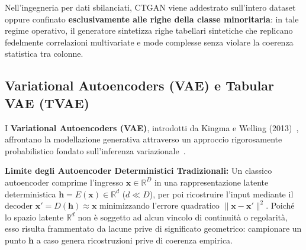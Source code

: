 Nell'ingegneria per dati sbilanciati, CTGAN viene addestrato sull'intero dataset oppure confinato \textbf{esclusivamente alle righe della classe minoritaria}: in tale regime operativo, il generatore sintetizza righe tabellari sintetiche che replicano fedelmente correlazioni multivariate e mode complesse senza violare la coerenza statistica tra colonne.

\FloatBarrier
\subsection{Variational Autoencoders (VAE) e Tabular VAE (TVAE)}
\label{subsec:dm-vae-tvae}

I \textbf{Variational Autoencoders (VAE)}, introdotti da Kingma e Welling (2013)~\cite{kingma2013}, affrontano la modellazione generativa attraverso un approccio rigorosamente probabilistico fondato sull'inferenza variazionale~\cite{mannocci2026imbalanced}.

\textbf{Limite degli Autoencoder Deterministici Tradizionali:}
Un classico autoencoder comprime l'ingresso $\mathbf{x} \in \mathbb{R}^D$ in una rappresentazione latente deterministica $\mathbf{h} = E(\mathbf{x}) \in \mathbb{R}^d$ ($d \ll D$), per poi ricostruire l'input mediante il decoder $\mathbf{x}' = D(\mathbf{h}) \approx \mathbf{x}$ minimizzando l'errore quadratico $\|\mathbf{x} - \mathbf{x}'\|^2$. Poiché lo spazio latente $\mathbb{R}^d$ non è soggetto ad alcun vincolo di continuità o regolarità, esso risulta frammentato da lacune prive di significato geometrico: campionare un punto $\mathbf{h}$ a caso genera ricostruzioni prive di coerenza empirica.

